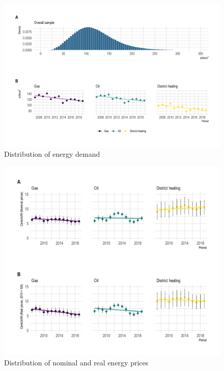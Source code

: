 \documentclass[12pt,twoside]{reedthesis}
\begin{document}
\begin{figure}

{\centering \includegraphics[width=1\linewidth]{figure/demand_descriptive} 

}

\caption{Distribution of energy demand}\label{fig:demand-descriptive-graph}
\end{figure}
\begin{figure}

{\centering \includegraphics[width=1\linewidth]{figure/prices_descriptive} 

}

\caption{Distribution of nominal and real energy prices}\label{fig:price-descriptive-graph}
\end{figure}
\end{document}
